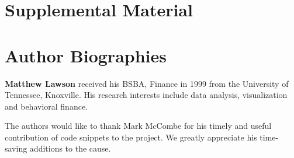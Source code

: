 \documentclass[9pt,twocolumn,twoside]{../../styles/osajnl}
\begin{document}
\section{Supplemental Material}



 
\section*{Author Biographies}
\begingroup
\setlength\intextsep{0pt}
\begin{minipage}[t][3.2cm][t]{1.0\columnwidth} %
  \noindent
  {\bfseries Matthew Lawson} received his BSBA, Finance in 1999 from
  the University of Tennessee, Knoxville. His research interests include
  data analysis, visualization and behavioral finance.
\end{minipage}
\endgroup

\appendix
\begin{description}

\item The authors would like to thank Mark McCombe for his timely and useful contribution of code snippets  to the project.  We greatly appreciate his time-saving additions to the cause.

\end{description}
\end{document}

